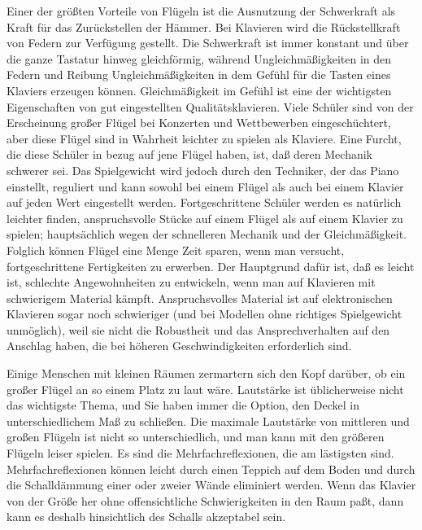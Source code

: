 Einer der größten Vorteile von Flügeln ist die Ausnutzung der Schwerkraft als Kraft für das Zurückstellen der Hämmer.
Bei Klavieren wird die Rückstellkraft von Federn zur Verfügung gestellt.
Die Schwerkraft ist immer konstant und über die ganze Tastatur hinweg gleichförmig, während Ungleichmäßigkeiten in den Federn und Reibung Ungleichmäßigkeiten in dem Gefühl für die Tasten eines Klaviers erzeugen können.
Gleichmäßigkeit im Gefühl ist eine der wichtigsten Eigenschaften von gut eingestellten Qualitätsklavieren.
Viele Schüler sind von der Erscheinung großer Flügel bei Konzerten und Wettbewerben eingeschüchtert, aber diese Flügel sind in Wahrheit leichter zu spielen als Klaviere.
Eine Furcht, die diese Schüler in bezug auf jene Flügel haben, ist, daß deren Mechanik schwerer sei.
Das Spielgewicht wird jedoch durch den Techniker, der das Piano einstellt, reguliert und kann sowohl bei einem Flügel als auch bei einem Klavier auf jeden Wert eingestellt werden.
Fortgeschrittene Schüler werden es natürlich leichter finden, anspruchsvolle Stücke auf einem Flügel als auf einem Klavier zu spielen; hauptsächlich wegen der schnelleren Mechanik und der Gleichmäßigkeit.
Folglich können Flügel eine Menge Zeit sparen, wenn man versucht, fortgeschrittene Fertigkeiten zu erwerben.
Der Hauptgrund dafür ist, daß es leicht ist, schlechte Angewohnheiten zu entwickeln, wenn man auf Klavieren mit schwierigem Material kämpft.
Anspruchsvolles Material ist auf elektronischen Klavieren sogar noch schwieriger (und bei Modellen ohne richtiges Spielgewicht unmöglich), weil sie nicht die Robustheit und das Ansprechverhalten auf den Anschlag haben, die bei höheren Geschwindigkeiten erforderlich sind.

Einige Menschen mit kleinen Räumen zermartern sich den Kopf darüber, ob ein großer Flügel an so einem Platz zu laut wäre.
Lautstärke ist üblicherweise nicht das wichtigste Thema, und Sie haben immer die Option, den Deckel in unterschiedlichem Maß zu schließen.
Die maximale Lautstärke von mittleren und großen Flügeln ist nicht so unterschiedlich, und man kann mit den größeren Flügeln leiser spielen.
Es sind die Mehrfachreflexionen, die am lästigsten sind.
Mehrfachreflexionen können leicht durch einen Teppich auf dem Boden und durch die Schalldämmung einer oder zweier Wände eliminiert werden.
Wenn das Klavier von der Größe her ohne offensichtliche Schwierigkeiten in den Raum paßt, dann kann es deshalb hinsichtlich des Schalls akzeptabel sein.



